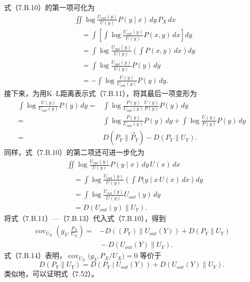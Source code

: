 式（7.B.10）的第一项可化为
\begin{equation}
\begin{aligned}
&\iint\log\frac{U_{out}(y)}{U(y)}P(y\mid x)\,dy\,P_X\,dx\\
&\quad=\int\left[\int\log\frac{U_{out}(y)}{U(y)}P(x,y)\,dx\right]dy\\
&\quad=\int\log\frac{U_{out}(y)}{U(y)}\left(\int P(x,y)\,dx\right)dy\\
&\quad=\int\log\frac{U_{out}(y)}{U(y)}P(y)\,dy\\
&\quad=-\int\log\frac{U(y)}{U_{out}(y)}P(y)\,dy.
\end{aligned}\tag{7.B.11}
\end{equation}
接下来，为用K–L距离表示式（7.B.11），将其最后一项变形为
\begin{equation}
\begin{aligned}
\int\log\frac{U(y)}{U_{out}(y)}P(y)\,dy
={}&\int\log\frac{P(y)}{U_{out}(y)}\frac{U(y)}{P(y)}P(y)\,dy\\
={}&\int\log\frac{P(y)}{U_{out}(y)}P(y)\,dy
 +\int\log\frac{U(y)}{P(y)}P(y)\,dy\\
={}&D(P_Y\parallel\vec P_Y)-D(P_Y\parallel U_Y).
\end{aligned}\tag{7.B.12}
\end{equation}
同样，式（7.B.10）的第二项还可进一步化为
\begin{equation}
\begin{aligned}
&\iint\log\frac{U_{out}(y)}{U(y)}P(y\mid x)\,dy\,U(x)\,dx\\
&\quad=\int\log\frac{U_{out}(y)}{U(y)}
 \left(\int P(y\mid x\,U(x)\,dx\right)dy\\
&\quad=\int\log\frac{U_{out}(y)}{U(y)}U_{out}(y)\,dy\\
&\quad=D(U_{out}(y)\parallel U_Y).
\end{aligned}\tag{7.B.13}
\end{equation}
将式（7.B.11）—（7.B.13）代入式（7.B.10），得到
\begin{equation}
\begin{aligned}
\operatorname{cov}_{U_X}\left(g_3,\frac{P_X}{U_X}\right)
={}&-D((P_Y)\parallel U_{out}(Y))+D(P_Y\parallel U_Y)\\
&{}-D(U_{out}(Y)\parallel U_Y).
\end{aligned}\tag{7.B.14}
\end{equation}
式（7.B.14）表明，$\operatorname{cov}_{U_X}\bigl(g_3,P_X/U_X\bigr)=0$ 等价于
\begin{equation}
D(P_Y\parallel U_Y)=D(P_Y\mid U_{out}(Y))
 +D(U_{out}(Y)\parallel U_Y).\tag{7.B.15}
\end{equation}
类似地，可以证明式（7.52）。
